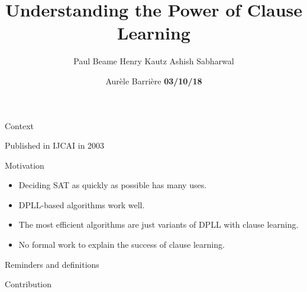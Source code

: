 \documentclass[page number]{beamer}
\def\outline{
  \begin{frame}[plain,noframenumbering]
    \frametitle{Outline}
    \tableofcontents[currentsection]
  \end{frame}
}
\begin{document}
\title[The Power of Clause Learning]{Understanding the Power of Clause Learning}

\author{Paul Beame \hfill Henry Kautz \hfill Ashish Sabharwal}
\vfill
\date{
  \vfill
  Aur\`ele Barri\`ere
  \vfill
  \textbf{03/10/18}}

\def\outline{
  \begin{frame}[plain,noframenumbering]
    \frametitle{Outline}
    \tableofcontents[currentsection]
  \end{frame}
}

\begin{frame}
  \vspace{-2cm}
  \maketitle
  \vspace{-4cm}
\end{frame}



\begin{frame}{Context}
  \begin{block}{Published in IJCAI in 2003}
  \end{block}
  \vfill
  \begin{block}{Motivation}
    \begin{itemize}
    \item Deciding SAT as quickly as possible has many uses.
    \item DPLL-based algorithms work well.
    \item The most efficient algorithms are just variants of DPLL with clause learning.
    \item No formal work to explain the success of clause learning.
    \end{itemize}
  \end{block}
\end{frame}

\begin{frame}{Reminders and definitions}
\end{frame}

\begin{frame}{Contribution}
\end{frame}
\end{document}
